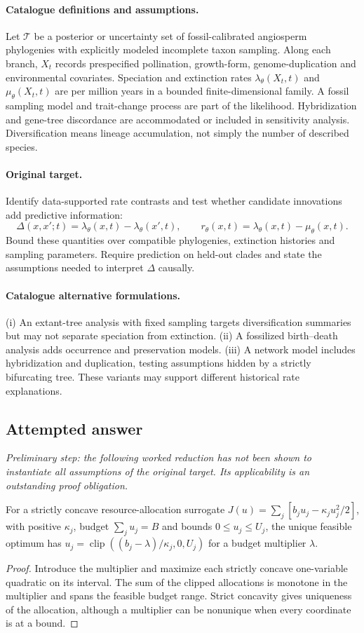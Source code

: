 \documentclass[11pt]{article}
\begin{document}
\paragraph{Catalogue definitions and assumptions.}
Let $\mathcal T$ be a posterior or uncertainty set of fossil-calibrated angiosperm phylogenies with explicitly modeled incomplete taxon sampling. Along each branch, $X_t$ records prespecified pollination, growth-form, genome-duplication and environmental covariates. Speciation and extinction rates $\lambda_\theta(X_t,t)$ and $\mu_\theta(X_t,t)$ are per million years in a bounded finite-dimensional family. A fossil sampling model and trait-change process are part of the likelihood. Hybridization and gene-tree discordance are accommodated or included in sensitivity analysis. Diversification means lineage accumulation, not simply the number of described species.
\paragraph{Original target.}
Identify data-supported rate contrasts and test whether candidate innovations add predictive information:
    \[\Delta(x,x';t)=\lambda_\theta(x,t)-\lambda_\theta(x',t),\qquad
    r_\theta(x,t)=\lambda_\theta(x,t)-\mu_\theta(x,t).\]
    Bound these quantities over compatible phylogenies, extinction histories and sampling parameters. Require prediction on held-out clades and state the assumptions needed to interpret $\Delta$ causally.
\paragraph{Catalogue alternative formulations.}
(i) An extant-tree analysis with fixed sampling targets diversification summaries but may not separate speciation from extinction. (ii) A fossilized birth--death analysis adds occurrence and preservation models. (iii) A network model includes hybridization and duplication, testing assumptions hidden by a strictly bifurcating tree. These variants may support different historical rate explanations.
\subsection{Attempted answer}
\noindent\emph{Preliminary step: the following worked reduction has not been shown to instantiate all assumptions of the original target. Its applicability is an outstanding proof obligation.}

\begin{proposition}
For a strictly concave resource-allocation surrogate $J(u)=\sum_j[b_ju_j-\kappa_j u_j^2/2]$, with positive $\kappa_j$, budget $\sum_ju_j=B$ and bounds $0\leq u_j\leq U_j$, the unique feasible optimum has $u_j=\operatorname{clip}((b_j-\lambda)/\kappa_j,0,U_j)$ for a budget multiplier $\lambda$.
\end{proposition}
\begin{proof}
Introduce the multiplier and maximize each strictly concave one-variable quadratic on its interval. The sum of the clipped allocations is monotone in the multiplier and spans the feasible budget range. Strict concavity gives uniqueness of the allocation, although a multiplier can be nonunique when every coordinate is at a bound.
\end{proof}
\end{document}
